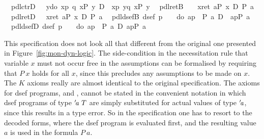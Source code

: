 \begin{isabellebody}
\ \ pdl{\isacharunderscore}ctrD{\isacharcolon}\ \ {\isachardoublequote}{\isasymturnstile}\ {\isasymlangle}y{\isasymleftarrow}do\ {\isacharbraceleft}x{\isasymleftarrow}p{\isacharsemicolon}\ q\ x{\isacharbraceright}{\isasymrangle}{\isacharparenleft}P\ y{\isacharparenright}\ {\isasymlongrightarrow}\isactrlsub D\ \ {\isasymlangle}x{\isasymleftarrow}p{\isacharsemicolon}\ y{\isasymleftarrow}q\ x{\isasymrangle}{\isacharparenleft}P\ y{\isacharparenright}{\isachardoublequote}\isanewline
\ \ pdl{\isacharunderscore}retB{\isacharcolon}\ \ {\isachardoublequote}{\isasymturnstile}\ {\isacharbrackleft}{\isacharhash}\ x{\isasymleftarrow}ret\ a{\isacharbrackright}{\isacharparenleft}P\ x{\isacharparenright}\ {\isasymlongleftrightarrow}\isactrlsub D\ P\ a{\isachardoublequote}\isanewline
\ \ pdl{\isacharunderscore}retD{\isacharcolon}\ \ {\isachardoublequote}{\isasymturnstile}\ {\isasymlangle}x{\isasymleftarrow}ret\ a{\isasymrangle}{\isacharparenleft}P\ x{\isacharparenright}\ {\isasymlongleftrightarrow}\isactrlsub D\ P\ a{\isachardoublequote}\isanewline
\ \ pdl{\isacharunderscore}dsefB{\isacharcolon}\ {\isachardoublequote}dsef\ p\ {\isasymLongrightarrow}\ {\isasymturnstile}\ {\isasymUp}\ {\isacharparenleft}do\ {\isacharbraceleft}a{\isasymleftarrow}p{\isacharsemicolon}\ {\isasymDown}\ {\isacharparenleft}P\ a{\isacharparenright}{\isacharbraceright}{\isacharparenright}\ {\isasymlongleftrightarrow}\isactrlsub D\ {\isacharbrackleft}{\isacharhash}\ a{\isasymleftarrow}p{\isacharbrackright}{\isacharparenleft}P\ a{\isacharparenright}{\isachardoublequote}\isanewline
\ \ pdl{\isacharunderscore}dsefD{\isacharcolon}\ {\isachardoublequote}dsef\ p\ {\isasymLongrightarrow}\ {\isasymturnstile}\ {\isasymUp}\ {\isacharparenleft}do\ {\isacharbraceleft}a{\isasymleftarrow}p{\isacharsemicolon}\ {\isasymDown}\ {\isacharparenleft}P\ a{\isacharparenright}{\isacharbraceright}{\isacharparenright}\ {\isasymlongleftrightarrow}\isactrlsub D\ {\isasymlangle}a{\isasymleftarrow}p{\isasymrangle}{\isacharparenleft}P\ a{\isacharparenright}{\isachardoublequote}\isamarkupfalse%
\isanewline
\end{isabellebody}

This specification does not look all that different from the original one
presented in Figure~\ref{fig:mon-dyn-logic}. The side-condition in the
necessitation rule that variable $x$ must not occur free in the assumptions can
be formalised by requiring that $P\ x$ holds for all $x$, since this precludes
any assumptions to be made on $x$. The $K$ axioms really are almost identical to
the original specification. The axioms for dsef programs,  and
, cannot be stated in the convenient notation in which dsef
programs of type ${'\!\mathit{a}}\ T$ are simply substituted for actual values of type
${'\!\mathit{a}}$, since this results in a type error. So in the specification one has
to resort to the decoded forms, where the dsef program is evaluated first, and
the resulting value $a$ is used in the formula $P\ a$.

